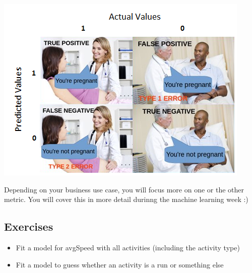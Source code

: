 \documentclass[
]{book}
\providecommand{\tightlist}{%
  \setlength{\itemsep}{0pt}\setlength{\parskip}{0pt}}
\begin{document}
\includegraphics{img/conf_matrix.png}

Depending on your business use case, you will focus more on one or the other metric. You will cover this in more detail durinng the machine learning week :)

\hypertarget{exercises-1}{%
\subsection{Exercises}\label{exercises-1}}

\begin{itemize}
\tightlist
\item
  Fit a model for avgSpeed with all activities (including the activity type)
\item
  Fit a model to guess whether an activity is a run or something else
\end{itemize}

  
\end{document}
